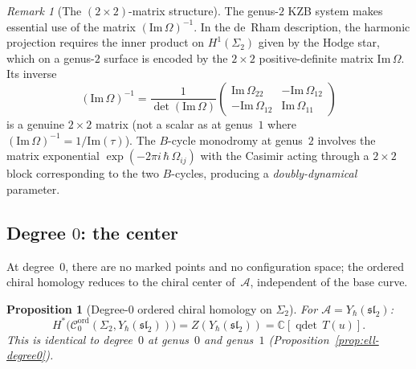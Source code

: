 \documentclass[11pt,reqno]{amsart}
\newtheorem{proposition}[theorem]{Proposition}
\theoremstyle{definition}
\theoremstyle{remark}
\newtheorem{remark}[theorem]{Remark}
\newcommand{\cA}{\mathcal{A}}
\newcommand{\cC}{\mathcal{C}}
\newcommand{\CC}{\mathbb{C}}
\numberwithin{equation}{section}
\begin{document}
\begin{remark}[The $(2 \times 2)$-matrix structure]
\label{rem:matrix-structure-g2}
The genus-$2$ KZB system makes essential use of the
matrix $(\mathrm{Im}\,\Omega)^{-1}$. In the de~Rham
description, the harmonic projection requires the
inner product on $H^1(\Sigma_2)$ given by the Hodge
star, which on a genus-$2$ surface is encoded by the
$2 \times 2$ positive-definite matrix
$\mathrm{Im}\,\Omega$. Its inverse
\begin{equation}\label{eq:im-omega-inv}
  (\mathrm{Im}\,\Omega)^{-1}
  = \frac{1}{\det(\mathrm{Im}\,\Omega)}
  \begin{pmatrix}
    \mathrm{Im}\,\Omega_{22} &
    -\mathrm{Im}\,\Omega_{12} \\
    -\mathrm{Im}\,\Omega_{12} &
    \mathrm{Im}\,\Omega_{11}
  \end{pmatrix}
\end{equation}
is a genuine $2 \times 2$ matrix (not a scalar as at
genus~$1$ where $(\mathrm{Im}\,\Omega)^{-1} =
1/\mathrm{Im}(\tau)$). The $B$-cycle monodromy at
genus~$2$ involves the matrix exponential
$\exp(-2\pi i\,\hbar\,\Omega_{ij})$ with the Casimir
acting through a $2 \times 2$ block corresponding to
the two $B$-cycles, producing a \emph{doubly-dynamical}
parameter.
\end{remark}

\subsection{Degree $0$: the center}
\label{subsec:g2-degree0}

At degree~$0$, there are no marked points and no
configuration space; the ordered chiral homology reduces
to the chiral center of~$\cA$, independent of the base
curve.

\begin{proposition}[Degree-$0$ ordered chiral homology on
$\Sigma_2$]
\label{prop:g2-degree0}
For $\cA = Y_\hbar(\mathfrak{sl}_2)$:
\begin{equation}\label{eq:g2-degree0}
  H^*\bigl(\cC_0^{\mathrm{ord}}(\Sigma_2,
  Y_\hbar(\mathfrak{sl}_2))\bigr)
  = Z(Y_\hbar(\mathfrak{sl}_2))
  = \CC[\operatorname{qdet}\,T(u)].
\end{equation}
This is identical to degree~$0$ at genus~$0$
and genus~$1$
\textup{(}Proposition~\textup{\ref{prop:ell-degree0}}\textup{)}.
\end{proposition}
\end{document}
